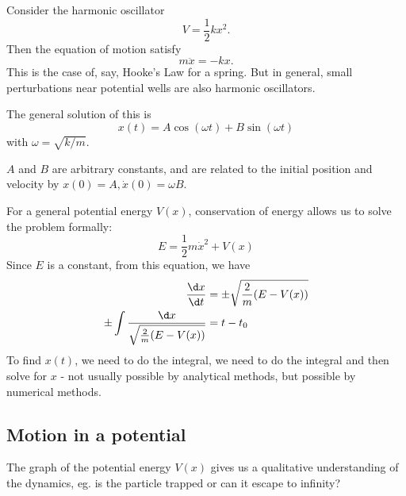 \documentclass[a4paper]{article}
\begin{document}
\begin{eg}
  Consider the harmonic oscillator
  \[
    V = \frac{1}{2} kx^2.
  \]
  Then the equation of motion satisfy
  \[
    m\ddot{x} = -kx.
  \]
  This is the case of, say, Hooke's Law for a spring. But in general, small perturbations near potential wells are also harmonic oscillators.

  The general solution of this is
  \[
    x(t) = A\cos (\omega t) + B\sin (\omega t)
  \]
  with $\omega = \sqrt{k/m}$.

  $A$ and $B$ are arbitrary constants, and are related to the initial position and velocity by $x(0) = A, \dot{x}(0) = \omega B$.
\end{eg}

For a general potential energy $V(x)$, conservation of energy allows us to solve the problem formally:
\[
  E = \frac{1}{2}m\dot{x}^2 + V(x)
\]
Since $E$ is a constant, from this equation, we have
\begin{align*}
  \frac{\d x}{\d t} &= \pm \sqrt{\frac{2}{m}(E - V(x))}\\
  \pm \int \frac{\d x}{\sqrt{\frac{2}{m}(E - V(x))}} &= t - t_0
\end{align*}
To find $x(t)$, we need to do the integral, we need to do the integral and then solve for $x$ - not usually possible by analytical methods, but possible by numerical methods.

\subsection{Motion in a potential}
The graph of the potential energy $V(x)$ gives us a qualitative understanding of the dynamics, eg. is the particle trapped or can it escape to infinity?
\end{document}
